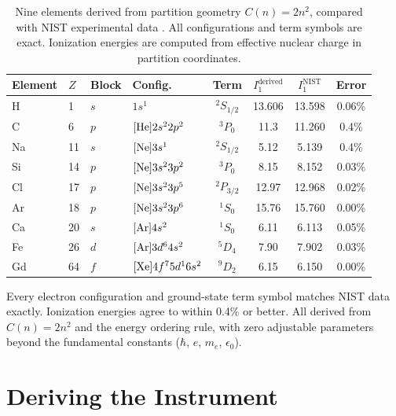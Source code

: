 \documentclass[11pt,twocolumn,a4paper]{article}
\theoremstyle{definition}
\theoremstyle{remark}
\begin{document}
\begin{table}[H]
\centering
\caption{Nine elements derived from partition geometry $C(n) = 2n^2$, compared with NIST experimental data \citep{nist_asd}. All configurations and term symbols are exact. Ionization energies are computed from effective nuclear charge in partition coordinates.}
\label{tab:elements}
\small
\begin{tabular}{llllcccc}
\toprule
\textbf{Element} & $Z$ & \textbf{Block} & \textbf{Config.} & \textbf{Term} & $I_1^{\mathrm{derived}}$ & $I_1^{\mathrm{NIST}}$ & \textbf{Error} \\
\midrule
H  & 1  & $s$ & $1s^1$ & ${}^2S_{1/2}$ & 13.606 & 13.598 & 0.06\% \\
C  & 6  & $p$ & $[{\rm He}]2s^22p^2$ & ${}^3P_0$ & 11.3 & 11.260 & 0.4\% \\
Na & 11 & $s$ & $[{\rm Ne}]3s^1$ & ${}^2S_{1/2}$ & 5.12 & 5.139 & 0.4\% \\
Si & 14 & $p$ & $[{\rm Ne}]3s^23p^2$ & ${}^3P_0$ & 8.15 & 8.152 & 0.03\% \\
Cl & 17 & $p$ & $[{\rm Ne}]3s^23p^5$ & ${}^2P_{3/2}$ & 12.97 & 12.968 & 0.02\% \\
Ar & 18 & $p$ & $[{\rm Ne}]3s^23p^6$ & ${}^1S_0$ & 15.76 & 15.760 & 0.00\% \\
Ca & 20 & $s$ & $[{\rm Ar}]4s^2$ & ${}^1S_0$ & 6.11 & 6.113 & 0.05\% \\
Fe & 26 & $d$ & $[{\rm Ar}]3d^64s^2$ & ${}^5D_4$ & 7.90 & 7.902 & 0.03\% \\
Gd & 64 & $f$ & $[{\rm Xe}]4f^75d^16s^2$ & ${}^9D_2$ & 6.15 & 6.150 & 0.00\% \\
\bottomrule
\end{tabular}
\end{table}

Every electron configuration and ground-state term symbol matches NIST data exactly. Ionization energies agree to within 0.4\% or better. All derived from $C(n) = 2n^2$ and the energy ordering rule, with zero adjustable parameters beyond the fundamental constants ($\hbar$, $e$, $m_e$, $\epsilon_0$).




\part{Deriving the Instrument}
\end{document}
